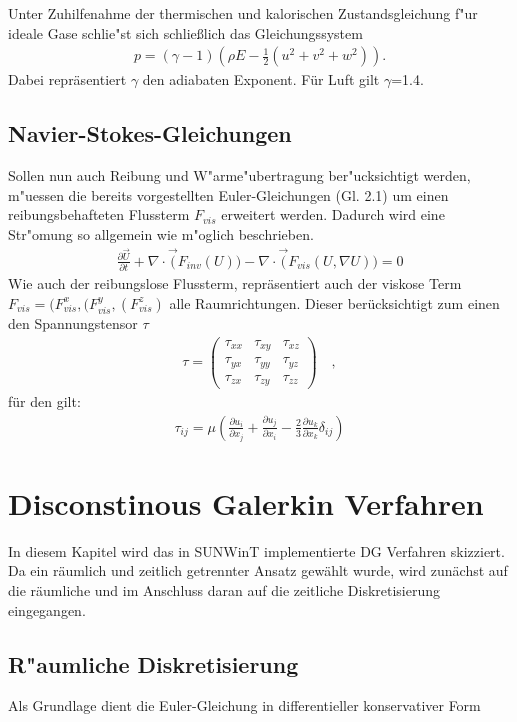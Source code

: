 Unter Zuhilfenahme der thermischen und kalorischen Zustandsgleichung f"ur ideale Gase schlie"st sich schließlich das Gleichungssystem
\begin{gather}
p = (\gamma -1)(\rho E - \frac{1}{2}(u^{2}+v^{2}+w^{2})).
\end{gather}
Dabei repräsentiert $\gamma$ den adiabaten Exponent. Für Luft gilt $\gamma$=1.4.

\subsection{Navier-Stokes-Gleichungen}
Sollen nun auch Reibung und W"arme"ubertragung ber"ucksichtigt werden, m"uessen die bereits vorgestellten Euler-Gleichungen (Gl. 2.1) um einen reibungsbehafteten Flussterm $F_{vis}$ erweitert werden. Dadurch wird eine Str"omung so allgemein wie m"oglich beschrieben.
\begin{gather}
	\frac{\partial\vec{U}}{\partial t} + \nabla \cdot \vec(F_{inv}(U)) -  \nabla \cdot \vec(F_{vis}(U, \nabla U))= 0
\end{gather}
Wie auch der reibungslose Flussterm, repräsentiert auch der viskose Term $F_{vis}=(F^{x}_{vis}, (F^{y}_{vis}, (F^{z}_{vis})$ alle Raumrichtungen. Dieser berücksichtigt zum einen den Spannungstensor $\tau$
\begin{gather}
	\tau=\begin{pmatrix} 
	\tau_{xx} & \tau_{xy} & \tau_{xz}\\
	\tau_{yx} & \tau_{yy} & \tau_{yz}\\
	\tau_{zx} & \tau_{zy} & \tau_{zz}
	\end{pmatrix}
	\quad,
\end{gather}
für den gilt:
\begin{gather}
	\tau_{ij}=\mu (\frac{\partial u_{i}}{\partial x_{j}} +\frac{\partial u_{j}}{\partial x_{i}} - \frac{2}{3}\frac{\partial u_{k}}{\partial x_{k}}\delta_{ij} )
\end{gather}
\section{Disconstinous Galerkin Verfahren}
In diesem Kapitel wird das in SUNWinT implementierte DG Verfahren skizziert. Da ein räumlich und zeitlich getrennter Ansatz gewählt wurde, wird zunächst auf die räumliche und im Anschluss daran auf die zeitliche Diskretisierung eingegangen.

\subsection{R"aumliche Diskretisierung}
Als Grundlage dient die Euler-Gleichung in differentieller konservativer Form
